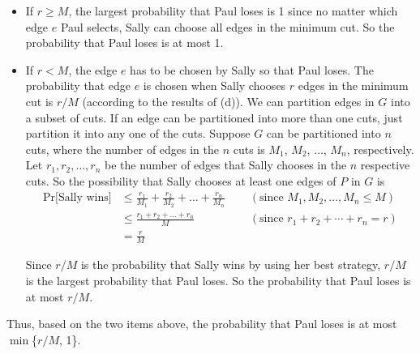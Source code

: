 \documentclass[letterpaper,11pt]{article}
\begin{document}
\begin{enumerate}
\begin{enumerate}
\begin{solution}
\begin{itemize}
\item If $r \ge M$, the largest probability that Paul loses is 1 since no
  matter which edge $e$ Paul selects, Sally can choose all edges in the minimum
  cut. So the probability that Paul loses is at most 1.
\item If $r < M$, the edge $e$ has to be chosen by Sally so that Paul loses.
  The probability that edge $e$ is chosen when Sally chooses $r$ edges in the
  minimum cut is $r/M$ (according to the results of (d)). We can partition
  edges in $G$ into a subset of cuts. If an edge can be partitioned into more
  than one cuts, just partition it into any one of the cuts. Suppose $G$ can be
  partitioned into $n$ cuts, where the number of edges in the $n$ cuts is
  $M_1$, $M_2$, $\dots$, $M_n$, respectively. Let $r_1, r_2, \dots, r_n$ be the
  number of edges that Sally chooses in the $n$ respective cuts. So the
  possibility that Sally chooses at least one edges of $P$ in $G$ is
\begin{align*}
\textrm{Pr[Sally wins]} &\le \frac{r_1}{M_1} + \frac{r_2}{M_2} + \dots +
\frac{r_n}{M_n}
~~~~~~&(\mbox{since $M_1, M_2, \dots, M_n \le M$}) \\
&\le \frac{r_1 + r_2 + \dots + r_n}{M} 
~~~~~~&(\mbox{since $r_1 + r_2 + \cdots + r_n = r$}) \\
&= \frac{r}{M}
\end{align*}

Since $r/M$ is the probability that Sally wins by using her best strategy,
$r/M$ is the largest probability that Paul loses. So the probability that Paul
loses is at most $r/M$.
\end{itemize}
Thus, based on the two items above, the probability that Paul loses is at most
$\min$\{$r/M$, 1\}.

    \end{solution}

\end{enumerate}


\end{enumerate}
\end{document}
